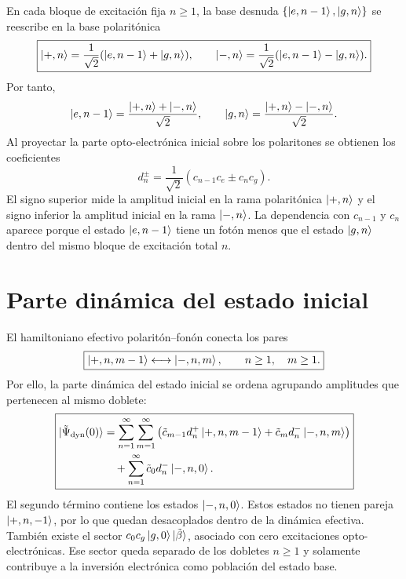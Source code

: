 \documentclass[11pt]{article}
\begin{document}
En cada bloque de excitaci\'on fija $n\geq1$, la base desnuda
$\{\ket{e,n-1},\ket{g,n}\}$ se reescribe en la base polarit\'onica
\begin{equation}
  \boxed{
  \ket{+,n}
  =
  \frac{1}{\sqrt2}(\ket{e,n-1}+\ket{g,n}),
  \qquad
  \ket{-,n}
  =
  \frac{1}{\sqrt2}(\ket{e,n-1}-\ket{g,n}).
  }
\end{equation}
Por tanto,
\begin{equation}
  \ket{e,n-1}
  =
  \frac{\ket{+,n}+\ket{-,n}}{\sqrt2},
  \qquad
  \ket{g,n}
  =
  \frac{\ket{+,n}-\ket{-,n}}{\sqrt2}.
\end{equation}
Al proyectar la parte opto-electr\'onica inicial sobre los polaritones se
obtienen los coeficientes
\begin{equation}
  \boxed{
  d_n^\pm
  =
  \frac{1}{\sqrt2}
  (c_{n-1}c_e\pm c_nc_g).
  }
\end{equation}
El signo superior mide la amplitud inicial en la rama polarit\'onica
$\ket{+,n}$ y el signo inferior la amplitud inicial en la rama
$\ket{-,n}$. La dependencia con $c_{n-1}$ y $c_n$ aparece porque el estado
$\ket{e,n-1}$ tiene un fot\'on menos que el estado $\ket{g,n}$ dentro del mismo
bloque de excitaci\'on total $n$.

\section{Parte din\'amica del estado inicial}

El hamiltoniano efectivo polarit\'on--fon\'on conecta los pares
\begin{equation}
  \boxed{
  \ket{+,n,m-1}
  \longleftrightarrow
  \ket{-,n,m},
  \qquad n\geq1,\quad m\geq1.
  }
\end{equation}
Por ello, la parte din\'amica del estado inicial se ordena agrupando amplitudes
que pertenecen al mismo doblete:
\begin{equation}
  \boxed{
  \begin{aligned}
  \ket{\tilde\Psi_{\mathrm{dyn}}(0)}
  &=
  \sum_{n=1}^{\infty}
  \sum_{m=1}^{\infty}
  \left(
  \tilde c_{m-1}d_n^+\ket{+,n,m-1}
  +
  \tilde c_md_n^-\ket{-,n,m}
  \right)
  \\
  &\quad+
  \sum_{n=1}^{\infty}
  \tilde c_0d_n^-\ket{-,n,0}.
  \end{aligned}
  }
\end{equation}
El segundo t\'ermino contiene los estados $\ket{-,n,0}$. Estos estados no tienen
pareja $\ket{+,n,-1}$, por lo que quedan desacoplados dentro de la din\'amica
efectiva. Tambi\'en existe el sector $c_0c_g\ket{g,0}\ket{\tilde\beta}$,
asociado con cero excitaciones opto-electr\'onicas. Ese sector queda separado
de los dobletes $n\geq1$ y solamente contribuye a la inversi\'on electr\'onica
como poblaci\'on del estado base.
\end{document}
